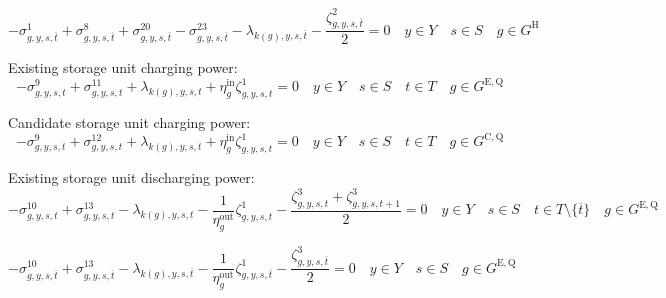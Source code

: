 \documentclass{article}
\newcommand{\sGeneratorsHydro}{G^{\mathrm{H}}}
\newcommand{\sStorageExisting}{G^{\mathrm{E,Q}}}
\newcommand{\sStorageCandidate}{G^{\mathrm{C,Q}}}
\newcommand{\sYears}{Y}
\newcommand{\sScenarios}{S}
\newcommand{\sIntervals}{T}
\newcommand{\iGenerator}{g}
\newcommand{\iYear}{y}
\newcommand{\iScenario}{s}
\newcommand{\iInterval}{t}
\newcommand{\iIntervalTerminal}{\overline{\iInterval}}
\newcommand{\iZone}{z}
\newcommand{\cStorageUnitEfficiencyCharging}{\eta_{\iGenerator}^{\mathrm{in}}}
\newcommand{\cStorageUnitEfficiencyDischarging}{\eta_{\iGenerator}^{\mathrm{out}}}
\newcommand{\dMinPowerOutput}[1][\iGenerator,\iYear,\iScenario,\iInterval]{\sigma_{#1}^{1}}
\newcommand{\dMaxPowerOutputHydro}[1][\iGenerator,\iYear,\iScenario,\iInterval]{\sigma_{#1}^{8}}
\newcommand{\dNonNegativeCharging}[1][\iGenerator,\iYear,\iScenario,\iInterval]{\sigma_{#1}^{9}}
\newcommand{\dNonNegativeDischarging}[1][\iGenerator,\iYear,\iScenario,\iInterval]{\sigma_{#1}^{10}}
\newcommand{\dMaxChargingRateExisting}[1][\iGenerator,\iYear,\iScenario,\iInterval]{\sigma_{#1}^{11}}
\newcommand{\dMaxChargingRateCandidate}[1][\iGenerator,\iYear,\iScenario,\iInterval]{\sigma_{#1}^{12}}
\newcommand{\dMaxDischargingRateExisting}[1][\iGenerator,\iYear,\iScenario,\iInterval]{\sigma_{#1}^{13}}
\newcommand{\dRampRateUp}[1][\iGenerator,\iYear,\iScenario,\iInterval]{\sigma_{#1}^{20}}
\newcommand{\dRampRateDown}[1][\iGenerator,\iYear,\iScenario,\iInterval]{\sigma_{#1}^{23}}
\newcommand{\dPowerBalance}[1][\iZone,\iYear,\iScenario,\iInterval]{\lambda_{#1}}
\newcommand{\dStorageEnergyTransition}[1][\iGenerator,\iYear,\iScenario,\iInterval]{\zeta_{#1}^{1}}
\newcommand{\dGeneratorEnergyOutput}[1][\iGenerator,\iYear,\iScenario,\iInterval]{\zeta_{#1}^{2}}
\newcommand{\dStorageEnergyOutput}[1][\iGenerator,\iYear,\iScenario,\iInterval]{\zeta_{#1}^{3}}
\begin{document}
\begin{equation}
-\dMinPowerOutput[\iGenerator,\iYear,\iScenario,\iIntervalTerminal] + \dMaxPowerOutputHydro[\iGenerator,\iYear,\iScenario,\iIntervalTerminal] + \dRampRateUp[\iGenerator,\iYear,\iScenario,\iIntervalTerminal] - \dRampRateDown[\iGenerator,\iYear,\iScenario,\iIntervalTerminal] - \dPowerBalance[k(\iGenerator),\iYear,\iScenario,\iIntervalTerminal] - \frac{\dGeneratorEnergyOutput[\iGenerator,\iYear,\iScenario,\iIntervalTerminal]}{2} = 0 \quad \iYear \in \sYears \quad \iScenario \in \sScenarios \quad \iGenerator \in \sGeneratorsHydro
\end{equation}

Existing storage unit charging power:
\begin{equation}
- \dNonNegativeCharging + \dMaxChargingRateExisting + \dPowerBalance[k(\iGenerator),\iYear,\iScenario,\iInterval] + \cStorageUnitEfficiencyCharging\dStorageEnergyTransition = 0 \quad \iYear \in \sYears \quad \iScenario \in \sScenarios \quad \iInterval \in \sIntervals \quad \iGenerator \in \sStorageExisting
\end{equation}

Candidate storage unit charging power:
\begin{equation}
- \dNonNegativeCharging + \dMaxChargingRateCandidate + \dPowerBalance[k(\iGenerator),\iYear,\iScenario,\iInterval] + \cStorageUnitEfficiencyCharging\dStorageEnergyTransition = 0 \quad \iYear \in \sYears \quad \iScenario \in \sScenarios \quad \iInterval \in \sIntervals \quad \iGenerator \in \sStorageCandidate
\end{equation}

Existing storage unit discharging power:
\begin{equation}
- \dNonNegativeDischarging + \dMaxDischargingRateExisting - \dPowerBalance[k(\iGenerator),\iYear,\iScenario,\iInterval] - \frac{1}{\cStorageUnitEfficiencyDischarging} \dStorageEnergyTransition - \frac{\dStorageEnergyOutput + \dStorageEnergyOutput[\iGenerator,\iYear,\iScenario,\iInterval+1]}{2} = 0 \quad \iYear \in \sYears \quad \iScenario \in \sScenarios \quad \iInterval \in \sIntervals \setminus \{\iIntervalTerminal\} \quad \iGenerator \in \sStorageExisting
\end{equation}

\begin{equation}
- \dNonNegativeDischarging[\iGenerator,\iYear,\iScenario,\iIntervalTerminal] + \dMaxDischargingRateExisting[\iGenerator,\iYear,\iScenario,\iIntervalTerminal] - \dPowerBalance[k(\iGenerator),\iYear,\iScenario,\iIntervalTerminal] - \frac{1}{\cStorageUnitEfficiencyDischarging} \dStorageEnergyTransition[\iGenerator,\iYear,\iScenario,\iIntervalTerminal] - \frac{\dStorageEnergyOutput[\iGenerator,\iYear,\iScenario,\iIntervalTerminal]}{2} = 0 \quad \iYear \in \sYears \quad \iScenario \in \sScenarios \quad \iGenerator \in \sStorageExisting
\end{equation}
\end{document}

